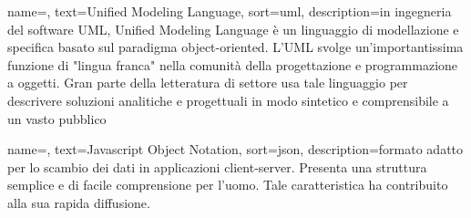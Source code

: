 {
    name=,
    text=Unified Modeling Language,
    sort=uml,
    description={in ingegneria del software UML, Unified Modeling Language è un linguaggio di modellazione e specifica basato sul paradigma object-oriented. L'UML svolge un’importantissima funzione di "lingua franca" nella comunità della progettazione e programmazione a oggetti. Gran parte della letteratura di settore usa tale linguaggio per descrivere soluzioni analitiche e progettuali in modo sintetico e comprensibile a un vasto pubblico}
}

{
    name=,
    text=Javascript Object Notation,
    sort=json,
    description={formato adatto per lo scambio dei dati in applicazioni client-server. Presenta una struttura semplice e di facile comprensione per l’uomo. Tale caratteristica ha contribuito alla sua rapida diffusione.}
}